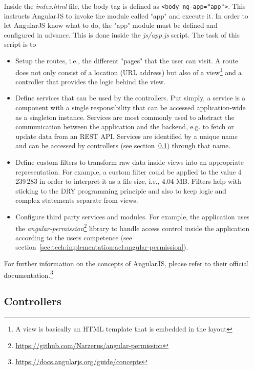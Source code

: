 \documentclass[nochapterpage,nopartpage,noheadingspace,numbersubsubsec,bigchapter,colorback,accentcolor=tud9c,10pt]{tudreport}
\begin{document}
    Inside the \emph{index.html} file, the body tag is defined as \texttt{<body ng-app="app">}. This instructs AngularJS to invoke the module called "app" and execute it. In order to let AngularJS know what to do, the "app" module must be defined and configured in advance. This is done inside the \emph{js/app.js} script. The task of this script is to
        \begin{itemize}
            \setlength\itemsep{0em}
            \item Setup the routes, i.e., the different "pages" that the user can visit. A route does not only consist of a location (URL address) but also of a view\footnote{A view is basically an HTML template that is embedded in the layout} and a controller that provides the logic behind the view.
            \item Define services that can be used by the controllers. Put simply, a service is a component with a single responsibility that can be accessed application-wide as a singleton instance. Services are most commonly used to abstract the communication between the application and the backend, e.g. to fetch or update data from an REST API. Services are identified by a unique name and can be accessed by controllers (see section~\ref{sec:tech:implementation:angularjs:controllers}) through that name.
            \item Define custom filters to transform raw data inside views into an appropriate representation. For example, a custom filter could be applied to the value 4\,239\,283 in order to interpret it as a file size, i.e., 4.04 MB. Filters help with sticking to the DRY programming principle and also to keep logic and complex statements separate from views.
            \item Configure third party services and modules. For example, the application uses the \emph{angular-permission}\footnote{\url{https://github.com/Narzerus/angular-permission}} library to handle access control inside the application according to the users competence (see section~\ref{sec:tech:implementation:acl:angular-permission}).
        \end{itemize}
    For further information on the concepts of AngularJS, please refer to their official documentation.\footnote{\url{https://docs.angularjs.org/guide/concepts}}

  \subsection{Controllers}
  \label{sec:tech:implementation:angularjs:controllers}
\end{document}
